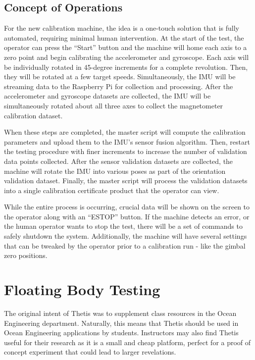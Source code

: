 \subsection{Concept of Operations} 
For the new calibration machine, the idea is a one-touch solution that is fully automated, requiring minimal human intervention.
At the start of the test, the operator can press the ``Start'' button and the machine will home each axis to a zero point and begin calibrating the accelerometer and gyroscope.
Each axis will be individually rotated in 45-degree increments for a complete revolution.
Then, they will be rotated at a few target speeds.
Simultaneously, the IMU will be streaming data to the Raspberry Pi for collection and processing.
After the accelerometer and gyroscope datasets are collected, the IMU will be simultaneously rotated about all three axes to collect the magnetometer calibration dataset.

When these steps are completed, the master script will compute the calibration parameters and upload them to the IMU's sensor fusion algorithm.
Then, restart the testing procedure with finer increments to increase the number of validation data points collected.
After the sensor validation datasets are collected, the machine will rotate the IMU into various poses as part of the orientation validation dataset.
Finally, the master script will process the validation datasets into a single calibration certificate product that the operator can view.

While the entire process is occurring, crucial data will be shown on the screen to the operator along with an ``ESTOP'' button.
If the machine detects an error, or the human operator wants to stop the test, there will be a set of commands to safely shutdown the system.
Additionally, the machine will have several settings that can be tweaked by the operator prior to a calibration run - like the gimbal zero positions.

\section{Floating Body Testing} 
The original intent of Thetis was to supplement class resources in the Ocean Engineering department.
Naturally, this means that Thetis should be used in Ocean Engineering applications by students.
Instructors may also find Thetis useful for their research as it is a small and cheap platform, perfect for a proof of concept experiment that could lead to larger revelations.

